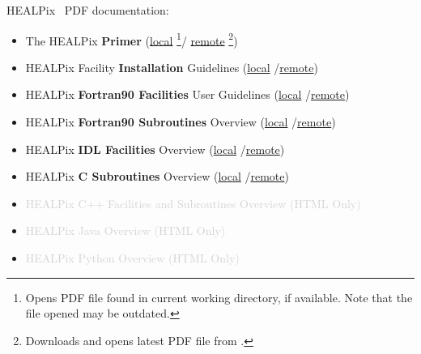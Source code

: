 \documentclass[12pt,twoside]{article}
\newcommand{\remoteloc}{\healpixwebpage}
\newcommand{\linksfn}[1]{%
(\href{#1}{local}%
\footnote{Opens PDF file found in current working directory, if available. Note that the file opened may be outdated.}/%
\href{\remoteloc/pdf/#1}{remote}%
\footnote{Downloads and opens latest PDF file from \href{\remoteloc/documentation.php}\remoteloc.})}
\newcommand{\links}[1]{%
(\href{#1}{local}%
/\href{\remoteloc/pdf/#1}{remote})}
\begin{document}
\thispagestyle{empty}



{\Large HEALPix \hpxversion\ PDF documentation:}
\begin{itemize}
%
    \item {The HEALPix \textbf{Primer}} 				\linksfn{intro.pdf}
    \item {HEALPix Facility \textbf{Installation} Guidelines} 		\links{install.pdf}
    \item {HEALPix \textbf{Fortran90 Facilities} User Guidelines}	\links{facilities.pdf}
    \item {HEALPix \textbf{Fortran90 Subroutines} Overview}		\links{subroutines.pdf}
    \item {HEALPix \textbf{IDL Facilities} Overview}			\links{idl.pdf}
    \item {HEALPix \textbf{C Subroutines} Overview}			\links{csub.pdf}
%
    \item \textcolor{lightgray} {HEALPix C++ Facilities and Subroutines Overview (HTML Only)}
    \item \textcolor{lightgray} {HEALPix Java Overview (HTML Only)}
    \item \textcolor{lightgray} {HEALPix Python Overview (HTML Only)}
\end{itemize}
\end{document}
